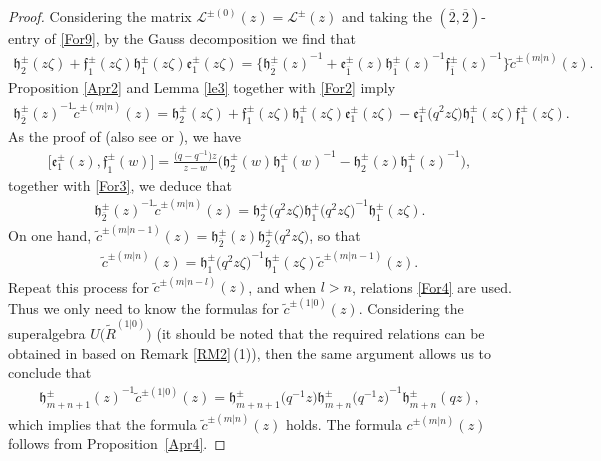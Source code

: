 \documentclass[pdftex]{sigma}
\numberwithin{equation}{section}
\begin{document}
\begin{proof}
Considering the matrix $ \mathcal{L}^{\pm (0)}(z)=\mathcal{L}^{\pm }(z)$ and taking the $(\overline{2},\overline{2})$-entry of \eqref{For9}, by the Gauss decomposition we find that
\begin{gather*}
 \mathfrak{h}_2^{\pm}(z\zeta)+\mathfrak{f}_1^{\pm}(z\zeta)\mathfrak{h}_1^{\pm}(z\zeta)\mathfrak{e}_1^{\pm}(z\zeta)=
 \bigl\{{\mathfrak{h}_{\overline{2}}^{\pm}(z)}^{-1}+\mathfrak{e}_{\overline{1}}^{\pm}(z){\mathfrak{h}_{\overline{1}}^{\pm}(z)}^{-1}
 {\mathfrak{f}_{\overline{1}}^{\pm}(z)}^{-1}\bigr\}\widetilde{c}^{\pm(m|n)}(z).
\end{gather*}Proposition \ref{Apr2} and Lemma \ref{le3} together with \eqref{For2} imply
\begin{gather*}
 {\mathfrak{h}_{\overline{2}}^{\pm}(z)}^{-1}\widetilde{c}^{\pm(m|n)}(z)=\mathfrak{h}_2^{\pm}(z\zeta)+\mathfrak{f}_1^{\pm}(z\zeta)\mathfrak{h}_1^{\pm}(z\zeta)
 \mathfrak{e}_1^{\pm}(z\zeta)-\mathfrak{e}_1^{\pm}\bigl(q^{2}z\zeta\bigr)\mathfrak{h}_1^{\pm}(z\zeta)\mathfrak{f}_1^{\pm}(z\zeta).
\end{gather*}
As the proof of \cite{HBKD} (also see \cite{JSKW} or \cite{YZC}), we have
\begin{gather*}
\bigl[\mathfrak{e}_1^{\pm}(z), \mathfrak{f}_1^{\pm}(w)\bigr]=\frac{\bigl(q-q^{-1}\bigr)z}{z-w}\bigl(\mathfrak{h}_2^{\pm}(w){\mathfrak{h}_1^{\pm}(w)}^{-1}-\mathfrak{h}_2^{\pm}(z)
{\mathfrak{h}_1^{\pm}(z)}^{-1}\bigr),
\end{gather*}together with \eqref{For3}, we deduce that
\begin{gather*}
 {\mathfrak{h}_{\overline{2}}^{\pm}(z)}^{-1}\widetilde{c}^{\pm(m|n)}(z)=\mathfrak{h}_2^{\pm}\bigl(q^{2}z\zeta\bigr)
 {\mathfrak{h}_1^{\pm}\bigl(q^{2}z\zeta\bigr)}^{-1}\mathfrak{h}_1^{\pm}(z\zeta).
\end{gather*}
On one hand, $\widetilde{c}^{\pm(m|n-1)}(z)=\mathfrak{h}_{\overline{2}}^{\pm}(z)\mathfrak{h}_2^{\pm}\bigl(q^{2}z\zeta\bigr)$, so that
\begin{gather*}
 \widetilde{c}^{\pm(m|n)}(z)=
 {\mathfrak{h}_1^{\pm}\bigl(q^{2}z\zeta\bigr)}^{-1}\mathfrak{h}_1^{\pm}(z\zeta)\widetilde{c}^{\pm(m|n-1)}(z).
\end{gather*}
Repeat this process for $\widetilde{c}^{\pm(m|n-l)}(z)$, and when $l>n$, relations \eqref{For4} are used. Thus we only need to know the formulas for $\widetilde{c}^{\pm(1|0)}(z)$. Considering the superalgebra
 $U\bigl(\widetilde{R}^{(1|0)}\bigr)$ (it should be noted that the required relations can be obtained in \cite{JMAB} based on Remark \ref{RM2}\,(1)), then the same argument allows us to conclude that
\begin{gather*}
 {\mathfrak{h}_{m+n+1}^{\pm}(z)}^{-1}\widetilde{c}^{\pm(1|0)}(z)=\mathfrak{h}_{m+n+1}^{\pm}\bigl(q^{-1}z\bigr)
 {\mathfrak{h}_{m+n}^{\pm}\bigl(q^{-1}z\bigr)}^{-1}\mathfrak{h}_{m+n}^{\pm}(qz),
\end{gather*}which implies that the formula $\widetilde{c}^{\pm(m|n)}(z)$ holds. The formula $c^{\pm(m|n)}(z)$ follows from Proposition~\ref{Apr4}.
\end{proof}
\end{document}
